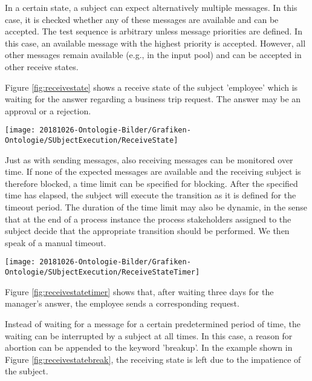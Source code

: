 In a certain state, a subject can expect alternatively multiple messages. In this case, it is checked whether any of these messages are available and can be accepted. The test sequence is arbitrary unless message priorities are defined. In this case, an available message with the highest priority is accepted. However, all other messages remain available (e.g., in the input pool) and can be accepted in other receive states.

Figure \ref{fig:receivestate} shows a receive state of the subject 'employee' which is waiting for the answer regarding a business trip request. The answer may be an approval or a rejection.

\begin{figure*}[htbp]
	\centering
	\texttt{[image: 20181026-Ontologie-Bilder/Grafiken-Ontologie/SUbjectExecution/ReceiveState]}
	\caption[Example of alternative receiving]{Example of alternative receiving}
	\label{fig:receivestate}
\end{figure*}

Just as with sending messages, also receiving messages can be monitored over time. If none of the expected messages are available and the receiving subject is therefore blocked, a time limit can be specified for blocking. After the specified time has elapsed, the subject will execute the transition as it is defined for the timeout period. The duration of the time limit may also be dynamic, in the sense that at the end of a process instance the process stakeholders assigned to the subject decide that the appropriate transition should be performed. We then speak of a manual timeout.

\begin{figure*}[htbp]
	\centering
	\texttt{[image: 20181026-Ontologie-Bilder/Grafiken-Ontologie/SUbjectExecution/ReceiveStateTimer]}
	\caption[Time monitoring for message reception]{Time monitoring for message reception}
	\label{fig:receivestatetimer}
\end{figure*}

Figure \ref{fig:receivestatetimer} shows that, after waiting three days for the manager's answer, the employee sends a corresponding request.

Instead of waiting for a message for a certain predetermined period of time, the waiting can be interrupted by a subject at all times. In this case, a reason for abortion can be appended to the keyword 'breakup'. In the example shown in Figure \ref{fig:receivestatebreak}, the receiving state is left due to the impatience of the subject.

